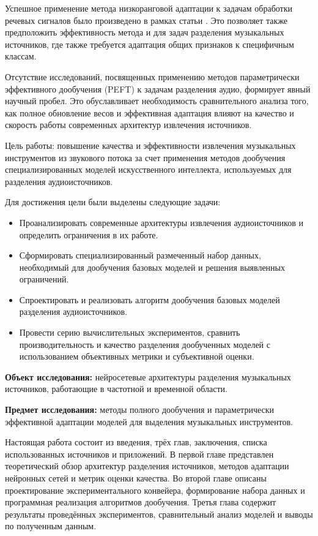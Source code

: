 \documentclass[14pt]{extarticle}
\begin{document}
Успешное применение метода низкоранговой адаптации к задачам обработки речевых сигналов было произведено в 
рамках статьи \cite{LoRA_emotion}. Это позволяет также предположить эффективность метода и для задач 
разделения музыкальных источников, где также требуется адаптация общих признаков к специфичным классам.

Отсутствие исследований, посвященных применению методов параметрически эффективного дообучения (PEFT) к 
задачам разделения аудио, формирует явный научный пробел. 
Это обуславливает необходимость сравнительного анализа того, как полное обновление весов и эффективная адаптация
влияют на качество и скорость работы современных архитектур извлечения источников.

Цель работы: повышение качества и эффективности извлечения музыкальных 
инструментов из звукового потока за счет применения методов дообучения специализированных моделей 
искусственного интеллекта, используемых для разделения аудиоисточников.

Для достижения цели были выделены следующие задачи:
\begin{itemize}[label=$\bullet$, wide]
	\item Проанализировать современные архитектуры извлечения аудиоисточников и определить ограничения в их работе.
	\item Сформировать специализированный размеченный набор данных, необходимый для дообучения базовых моделей и решения выявленных ограничений.
	\item Спроектировать и реализовать алгоритм дообучения базовых моделей разделения аудиоисточников.
	\item Провести серию вычислительных экспериментов, сравнить производительность и качество разделения дообученных моделей с использованием объективных метрики и субъективной оценки.
\end{itemize}


\textbf{Объект исследования:} нейросетевые архитектуры разделения музыкальных источников, работающие в частотной и временной области.

\textbf{Предмет исследования:} методы полного дообучения и параметрически эффективной адаптации моделей для выделения музыкальных 
инструментов.

Настоящая работа состоит из введения, трёх глав, заключения, списка использованных источников и приложений. 
В первой главе представлен теоретический обзор архитектур разделения источников, методов адаптации нейронных 
сетей и метрик оценки качества. Во второй главе описаны проектирование экспериментального конвейера, формирование 
набора данных и программная реализация алгоритмов дообучения. Третья глава содержит результаты проведённых 
экспериментов, сравнительный анализ моделей и выводы по полученным данным.
\end{document}
